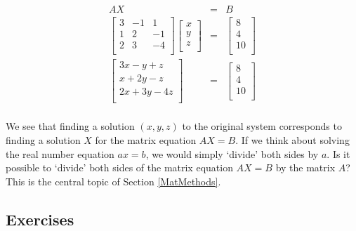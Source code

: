 \documentclass{ximera}
\begin{document}
\[ \begin{array}{rcl}

AX & = & B \\ [13pt]
\left[ \begin{array}{rrr} 3 & -1 & 1  \\ 1 & 2 & -1  \\ 2 & 3 & -4  \\ \end{array} \right] \left[ \begin{array}{r}  x \\  y \\  z \\ \end{array} \right] & = & \left[ \begin{array}{r}  8 \\  4 \\  10 \\ \end{array} \right] \\ [13pt]

\left[ \begin{array}{rrr} 3x -y +z  \\ x + 2y  -z  \\ 2x + 3y  -4 z \\ \end{array} \right] & = & \left[ \begin{array}{r}  8 \\  4 \\  10 \\ \end{array} \right] \\ [13pt]

\end{array}\]

We see that finding a solution $(x,y,z)$ to the original system corresponds to finding a solution $X$ for the matrix equation $AX = B$.   If we think about solving the real number equation $ax = b$, we would simply `divide' both sides by $a$. Is it possible to `divide' both sides of the matrix equation $AX = B$ by the matrix $A$?    This is the central topic of Section \ref{MatMethods}. 

\newpage

\subsection{Exercises}


\closegraphsfile
\end{document}

